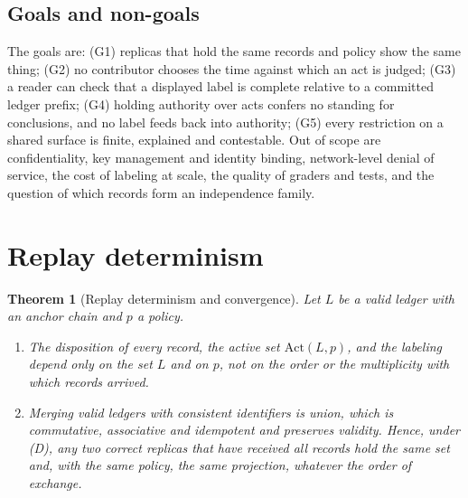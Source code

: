 \documentclass[11pt]{article}
\theoremstyle{plain}
\newtheorem{theorem}{Theorem}
\theoremstyle{definition}
\theoremstyle{remark}
\newcommand{\Act}{\mathrm{Act}}
\begin{document}
\subsection{Goals and non-goals}

The goals are: (G1) replicas that hold the same records and policy show the same thing; (G2) no contributor chooses the time against which an act is judged; (G3) a reader can check that a displayed label is complete relative to a committed ledger prefix; (G4) holding authority over acts confers no standing for conclusions, and no label feeds back into authority; (G5) every restriction on a shared surface is finite, explained and contestable. Out of scope are confidentiality, key management and identity binding, network-level denial of service, the cost of labeling at scale, the quality of graders and tests, and the question of which records form an independence family.

\section{Replay determinism}\label{sec:replay}

\begin{theorem}[Replay determinism and convergence]\label{thm:replay}
Let $L$ be a valid ledger with an anchor chain and $p$ a policy.
\begin{enumerate}[label=(\alph*)]
\item The disposition of every record, the active set $\Act(L,p)$, and the labeling depend only on the set $L$ and on $p$, not on the order or the multiplicity with which records arrived.
\item Merging valid ledgers with consistent identifiers is union, which is commutative, associative and idempotent and preserves validity. Hence, under (D), any two correct replicas that have received all records hold the same set and, with the same policy, the same projection, whatever the order of exchange.
\end{enumerate}
\end{theorem}
\end{document}
